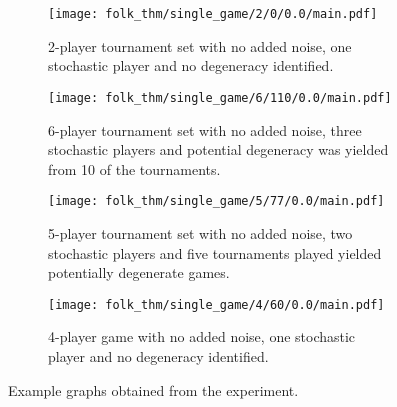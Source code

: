 \begin{figure}
    \begin{subfigure}{.45\textwidth}
        \centering
        \texttt{[image: folk\_thm/single\_game/2/0/0.0/main.pdf]}
        \caption{2-player tournament set with no added noise, one stochastic player and no degeneracy identified.}\label{subfig:clear_thresh_plot}
    \end{subfigure}
    \begin{subfigure}{.45\textwidth}
        \centering
        \texttt{[image: folk\_thm/single\_game/6/110/0.0/main.pdf]}
        \caption{6-player tournament set with no added noise, three stochastic players and potential degeneracy was yielded from 10 of the tournaments.}\label{subfig:unclear_thresh_plot}
    \end{subfigure}

    \begin{subfigure}{.45\textwidth}
        \centering
        \texttt{[image: folk\_thm/single\_game/5/77/0.0/main.pdf]}
        \caption{5-player tournament set with no added noise, two stochastic players and five tournaments played yielded potentially degenerate games.}\label{subfig:degenerate_plot}
    \end{subfigure}
    \begin{subfigure}{.45\textwidth}
        \centering
        \texttt{[image: folk\_thm/single\_game/4/60/0.0/main.pdf]}
        \caption{4-player game with no added noise, one stochastic player and no degeneracy identified.}\label{subfig:constant_plot}
    \end{subfigure}
    \caption{Example graphs obtained from the experiment.}\label{fig:example_graphs}
\end{figure}

